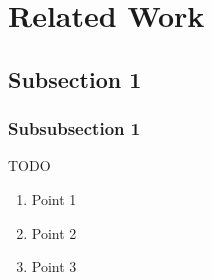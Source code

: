 \section{Related Work}
\subsection{Subsection 1}
\subsubsection{Subsubsection 1}
TODO
\begin{enumerate}
    \item Point 1
    \item Point 2
    \item Point 3
\end{enumerate}

